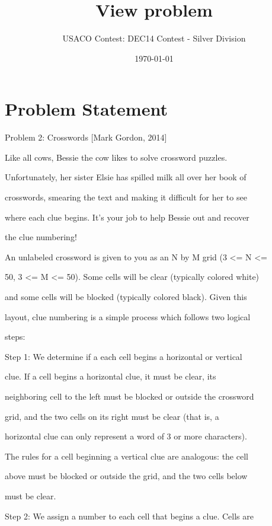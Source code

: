 \documentclass[12pt]{article}
\title{View problem}
\author{USACO Contest: DEC14 Contest - Silver Division}
\date{\today}
\begin{document}
\maketitle

\section*{Problem Statement}

Problem 2: Crosswords [Mark Gordon, 2014]



Like all cows, Bessie the cow likes to solve crossword puzzles.

Unfortunately, her sister Elsie has spilled milk all over her book of

crosswords, smearing the text and making it difficult for her to see

where each clue begins.  It's your job to help Bessie out and recover

the clue numbering!



An unlabeled crossword is given to you as an N by M grid (3 <= N <=

50, 3 <= M <= 50).  Some cells will be clear (typically colored white)

and some cells will be blocked (typically colored black). Given this

layout, clue numbering is a simple process which follows two logical

steps:



Step 1: We determine if a each cell begins a horizontal or vertical

clue.  If a cell begins a horizontal clue, it must be clear, its

neighboring cell to the left must be blocked or outside the crossword

grid, and the two cells on its right must be clear (that is, a

horizontal clue can only represent a word of 3 or more characters).

The rules for a cell beginning a vertical clue are analogous: the cell

above must be blocked or outside the grid, and the two cells below

must be clear.



Step 2: We assign a number to each cell that begins a clue.  Cells are
\end{document}
